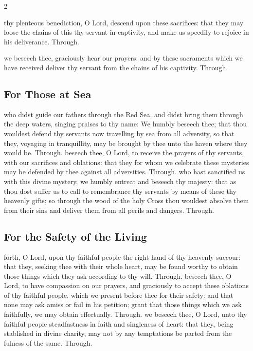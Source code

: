 \begin{multicols}{2}
   \newcolumn

\secret
{} thy plenteous benediction, O Lord, descend upon these sacrifices: that they may loose the chains of this thy servant in captivity, and make us speedily to rejoice in his deliverance. Through.

\postcommunion
{} we beseech thee, graciously hear our prayers: and by these sacraments which we have received deliver thy servant from the chains of his captivity. Through.

\subsection{For Those at Sea}
\collect
{} who didst guide our fathers through the Red Sea, and didst bring them through the deep waters, singing praises to thy name: We humbly beseech thee; that thou wouldest defend thy servants now travelling by sea from all adversity, so that they, voyaging in tranquillity, may be brought by thee unto the haven where they would be. Through.
\secret
{} beseech thee, O Lord, to receive the prayers of thy servants, with our sacrifices and oblations: that they for whom we celebrate these mysteries may be defended by thee against all adversities. Through.
\postcommunion
{} who hast sanctified us with this divine mystery, we humbly entreat and beseech thy majesty: that as thou dost suffer us to call to remembrance thy servants by means of these thy heavenly gifts; so through the wood of the holy Cross thou wouldest absolve them from their sins and deliver them from all perils and dangers. Through.

\subsection{For the Safety of the Living}
\collect
{} forth, O Lord, upon thy faithful people the right hand of thy heavenly succour: that they, seeking thee with their whole heart, may be found worthy to obtain those things which they ask according to thy will. Through.
\secret
{} beseech thee, O Lord, to have compassion on our prayers, and graciously to accept these oblations of thy faithful people, which we present before thee for their safety: and that none may ask amiss or fail in his petition; grant that those things which we ask faithfully, we may obtain effectually. Through.
\postcommunion
{} we beseech thee, O Lord, unto thy faithful people steadfastness in faith and singleness of heart: that they, being stablished in divine charity, may not by any temptations be parted from the fulness of the same. Through.


\end{multicols}
